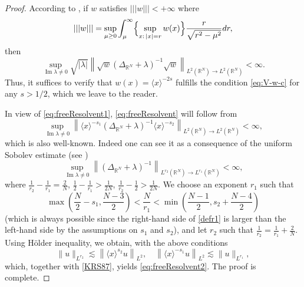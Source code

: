 \documentclass[10pt,leqno]{amsart}
\DeclareMathOperator{\im}{Im} %
\theoremstyle{definition}%
\theoremstyle{remark}
\numberwithin{equation}{section}
\newcommand{\R}{\mathbb{R}}
\renewcommand{\^}{\widehat}%
\begin{document}
\begin{proof}
	According to \cite[(b) in Theorem 1]{BaRuVe97}, if $w$ satisfies $|||w|||<+\infty$ where
	\begin{equation}
	\label{eq:V-w-c}
	|||w|||=\sup_{\mu\ge 0}\int_\mu^\infty\Bigl\{\sup_{x:\,|x|=r } w(x)\Bigr\}\frac{r}{\sqrt{r^2-\mu^2}}dr,
	\end{equation}
	then
	$$ \sup_{\im \lambda \neq 0} \sqrt{|\lambda|}\left\|\sqrt{w} (\Delta_{\R^N}+\lambda)^{-1}\sqrt{w}\right\|_{L^2(\R^N)\to L^2(\R^N)}<\infty.$$
	Thus, it suffices to verify that $w(x)=\langle x\rangle^{-2s}$ fulfills the condition \eqref{eq:V-w-c} for any $s>1/2$, which we leave to the reader.
	
	In view of \eqref{eq:freeResolvent1}, \eqref{eq:freeResolvent} will follow from 
\begin{equation}
\label{eq:freeResolvent2}
	\sup_{\im \lambda \neq 0}
 \left\|\langle x\rangle^{-s_1}(\Delta_{\mathbb{R}^N}+\lambda)^{-1}\langle x\rangle ^{-s_2}\right\|_{L^2(\mathbb{R}^N)\to L^2(\mathbb{R}^N)}<\infty,
\end{equation} 
which is also well-known. Indeed one can see it as a consequence of the uniform Sobolev estimate (see \cite[Lemma 2.2, b)]{KenigRuizSogge87})
\begin{equation}
\label{KRS87}
	\sup_{\im \lambda \neq 0}
 \left\|(\Delta_{\mathbb{R}^N}+\lambda)^{-1}\right\|_{L^{r_2}(\mathbb{R}^N)\to L^{r_1}(\mathbb{R}^N)}<\infty,
\end{equation}
where $\frac{1}{r_2}-\frac{1}{r_1}=\frac{2}{N}$, $\frac{1}{2}-\frac{1}{r_1}>\frac{1}{2N}$, $\frac{1}{r_2}-\frac{1}{2}>\frac{1}{2N}$. We choose an exponent $r_1$ such that 
\begin{equation}
 \label{defr1}
 \max\left( \frac{N}{2}-s_1,\frac{N-3}{2} \right)<\frac{N}{r_1}<\min\left( \frac{N-1}{2},s_2+\frac{N-4}{2} \right)
\end{equation} 
(which is always possible since the right-hand side of \eqref{defr1} is larger than the left-hand side by the assumptions on $s_1$ and $s_2$), and let $r_2$ such that $\frac{1}{r_2}=\frac{1}{r_1}+\frac{2}{N}$. Using H\"older inequality, we obtain, with the above conditions 
$$\|u\|_{L^{r_2}}\lesssim \left\|\langle x \rangle^{s_2}u\right\|_{L^2}, \quad \left\|\langle x\rangle^{-s_1}u\right\|_{L^2}\lesssim \|u\|_{L^{r_1}},$$ 
which, together with \eqref{KRS87}, yields
\eqref{eq:freeResolvent2}.
The proof is complete.
\end{proof}
\end{document}
